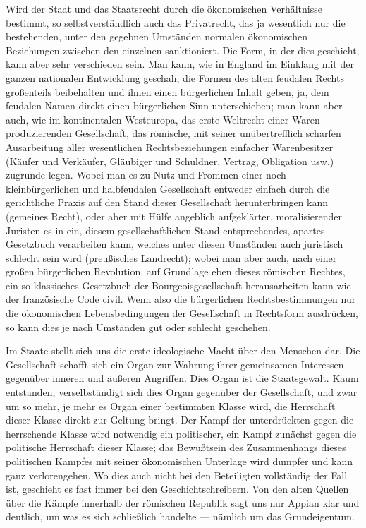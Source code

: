Wird der Staat und das Staatsrecht durch die ökonomischen
Verhältnisse bestimmt, so selbstverständlich auch das Privatrecht, das
ja wesentlich nur die bestehenden, unter den gegebnen Umständen normalen
ökonomischen Beziehungen zwischen den einzelnen sanktioniert. Die Form,
in der dies geschieht, kann aber sehr verschieden sein. Man kann, wie in
England im Einklang mit der ganzen nationalen Entwicklung geschah, die
Formen des alten feudalen Rechts großenteils beibehalten und ihnen einen
bürgerlichen Inhalt geben, ja, dem feudalen Namen direkt einen
bürgerlichen Sinn unterschieben; man kann aber auch, wie im
kontinentalen Westeuropa, das erste Weltrecht einer Waren produzierenden
Gesellschaft, das römische, mit seiner unübertrefflich scharfen
Ausarbeitung aller wesentlichen Rechtsbeziehungen einfacher
Warenbesitzer (Käufer und Verkäufer, Gläubiger und Schuldner, Vertrag,
Obligation usw.) zugrunde legen. Wobei man es zu Nutz und Frommen einer
noch kleinbürgerlichen und halbfeudalen Gesellschaft entweder einfach
durch die gerichtliche Praxis auf den Stand dieser Gesellschaft
herunterbringen kann (gemeines Recht), oder aber mit Hülfe angeblich
aufgeklärter, moralisierender Juristen es in ein, diesem
gesellschaftlichen Stand entsprechendes, apartes Gesetzbuch verarbeiten
kann, welches unter diesen Umständen auch juristisch schlecht sein wird
(preußisches Landrecht); wobei man aber auch, nach einer großen
bürgerlichen Revolution, auf Grundlage eben dieses römischen Rechtes,
ein so klassisches Gesetzbuch
der Bourgeoisgesellschaft herausarbeiten kann wie der französische Code
civil. Wenn also die bürgerlichen Rechtsbestimmungen nur die
ökonomischen Lebensbedingungen der Gesellschaft in Rechtsform
ausdrücken, so kann dies je nach Umständen gut oder schlecht geschehen.

Im Staate stellt sich uns die erste ideologische Macht über den
Menschen dar. Die Gesellschaft schafft sich ein Organ zur Wahrung ihrer
gemeinsamen Interessen gegenüber inneren und äußeren Angriffen. Dies
Organ ist die Staatsgewalt. Kaum entstanden, verselbständigt sich dies
Organ gegenüber der Gesellschaft, und zwar um so mehr, je mehr es Organ
einer bestimmten Klasse wird, die Herrschaft dieser Klasse direkt zur
Geltung bringt. Der Kampf der unterdrückten gegen die herrschende Klasse
wird notwendig ein politischer, ein Kampf zunächst gegen die politische
Herrschaft dieser Klasse; das Bewußtsein des Zusammenhangs dieses
politischen Kampfes mit seiner ökonomischen Unterlage wird dumpfer und
kann ganz verlorengehen. Wo dies auch nicht bei den Beteiligten
vollständig der Fall ist, geschieht es fast immer bei den
Geschichtschreibern. Von den alten Quellen über die Kämpfe innerhalb der
römischen Republik sagt uns nur Appian klar und deutlich, um was es sich
schließlich handelte --- nämlich um das Grundeigentum.

